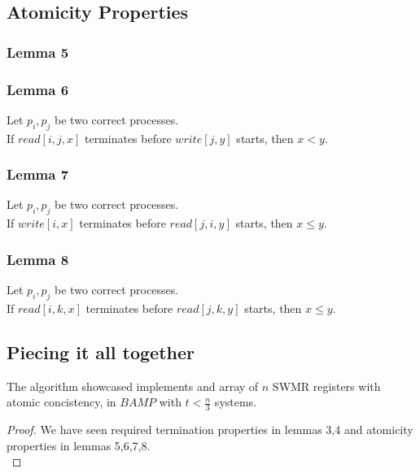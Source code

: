 \subsection{Atomicity Properties}
\begin{frame}
    \frametitle{Lemma 5}
\end{frame}
\begin{frame}
    \frametitle{Lemma 6}
    \begin{lemma}
        Let $p_i, p_j$ be two correct processes.\\
        If $read[i,j,x]$ terminates before $write[j,y]$ starts, then $x<y$.
    \end{lemma}
\end{frame}
\begin{frame}
    \frametitle{Lemma 7}
    \begin{lemma}
        Let $p_i, p_j$ be two correct processes.\\
        If $write[i,x]$ terminates before $read[j,i,y]$ starts, then $x\leq y$.
    \end{lemma}
\end{frame}
\begin{frame}
    \frametitle{Lemma 8}
    \begin{lemma}
        Let $p_i, p_j$ be two correct processes.\\
        If $read[i,k,x]$ terminates before $read[j,k,y]$ starts, then $x\leq y$.
    \end{lemma}
\end{frame}

\subsection{Piecing it all together}
\begin{frame}
    \begin{theorem}
        The algorithm showcased implements and array of $n$ SWMR
        registers with atomic concistency, in $BAMP$ with $t<\frac{n}{3}$ systems.
    \end{theorem}
    \begin{proof}
        We have seen required termination properties in lemmas 3,4 and atomicity
        properties in lemmas 5,6,7,8.\\
    \end{proof}
\end{frame}
